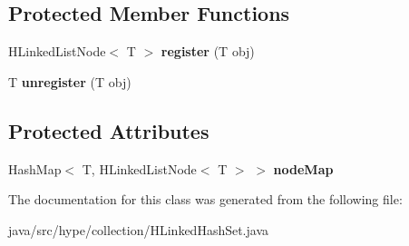 \subsection*{Protected Member Functions}
\begin{DoxyCompactItemize}
\item 
\hypertarget{classhype_1_1collection_1_1_h_linked_hash_set_3_01_t_01_4_a3b665ec7179794bc46c592e23cc395d3}{H\-Linked\-List\-Node$<$ T $>$ {\bfseries register} (T obj)}\label{classhype_1_1collection_1_1_h_linked_hash_set_3_01_t_01_4_a3b665ec7179794bc46c592e23cc395d3}

\item 
\hypertarget{classhype_1_1collection_1_1_h_linked_hash_set_3_01_t_01_4_af592576c6f64717a767e5836e7cb88e5}{T {\bfseries unregister} (T obj)}\label{classhype_1_1collection_1_1_h_linked_hash_set_3_01_t_01_4_af592576c6f64717a767e5836e7cb88e5}

\end{DoxyCompactItemize}
\subsection*{Protected Attributes}
\begin{DoxyCompactItemize}
\item 
\hypertarget{classhype_1_1collection_1_1_h_linked_hash_set_3_01_t_01_4_a6d6e269397d50752ff3551d3d59d3443}{Hash\-Map$<$ T, H\-Linked\-List\-Node$<$ T $>$ $>$ {\bfseries node\-Map}}\label{classhype_1_1collection_1_1_h_linked_hash_set_3_01_t_01_4_a6d6e269397d50752ff3551d3d59d3443}

\end{DoxyCompactItemize}


The documentation for this class was generated from the following file\-:\begin{DoxyCompactItemize}
\item 
java/src/hype/collection/H\-Linked\-Hash\-Set.\-java\end{DoxyCompactItemize}
